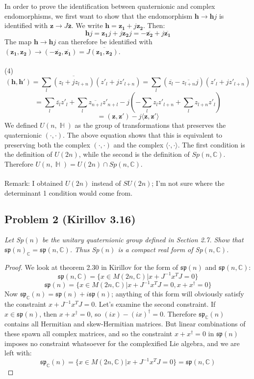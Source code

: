 \documentclass[12 pt]{article}
\newcommand{\C}{\mathbb{C}}
\DeclareMathOperator {\HH} {\mathbb{H}}
\begin{document}
\\
\\
In order to prove the identification between quaternionic and complex endomorphisms, we first want to show that the endomorphism $\mathbf{h} \to \mathbf{h}j$ is identified with $\mathbf{z} \to J \bar{\mathbf{z}}$. We write $\mathbf{h} = \mathbf{z_1} + j \mathbf{z_2}$. Then:
\[     \mathbf{h}j = \mathbf{z_1} j + j \mathbf{z_2} j = - \overline{\mathbf{z_2}} + j \overline{\mathbf{z_1}}  \]
The map $\mathbf{h} \to \mathbf{h}j$ can therefore be identified with $(\mathbf{z_1} , \mathbf{z_2}) \to ( - \overline{\mathbf{z_2}}, \overline{\mathbf{z_1}}) = J \overline{(\mathbf{z_1} , \mathbf{z_2})}$.
\\
\\
(4) \[     (\mathbf{h} , \mathbf{h'} ) = \sum_l \overline{(z_l + j z_{l+n})} (z'_l + j z'_{l+n}) = \sum_l (\overline{z_l} - \overline{z_{l+n}} j ) (z'_l + j z'_{l+n}) \]
\[     =  \sum_l \overline{z_l} z'_l + \sum_l \overline{z_{n+l}} z'_{n+l}   - j \left(- \sum_l z_l z'_{l+n} + \sum_l z_{l+n} z'_l  \right)   \]
\[    =   ( \mathbf{z} , \mathbf{z'} ) - j \langle \mathbf{z} , \mathbf{z'}  \rangle  \]
We defined $U(n, \HH)$ as the group of transformations that preserves the quaternionic $(\cdot, \cdot)$. The above equation shows that this is equivalent to preserving both the complex $(\cdot, \cdot)$ and the complex $\langle \cdot, \cdot \rangle$. The first condition is the definition of $U(2n)$, while the second is the definition of $Sp(n,\C)$. Therefore $U(n, \HH) = U(2n) \cap Sp(n,\C)$.
\\
\\
Remark: I obtained $U(2n)$ instead of $SU(2n)$; I'm not sure where the determinant 1 condition would come from.


\subsection*{Problem 2 (Kirillov 3.16)}
\emph{Let Sp$(n)$ be the unitary quaternionic group defined in Section 2.7. Show that $\mathfrak{sp}(n)_{\C} = \mathfrak{sp}(n,\C)$. Thus Sp$(n)$ is a compact real form of Sp$(n,\C)$.}

\begin{proof}
We look at theorem 2.30 in Kirillov for the form of $\mathfrak{sp} (n)$ and $\mathfrak{sp} (n,\C)$:
\[     \mathfrak{sp} (n,\C) = \{ x \in M(2n,\C) | x + J^{-1} x^T J = 0 \}       \]
\[     \mathfrak{sp} (n) = \{ x \in M(2n,\C) | x + J^{-1} x^T J = 0 , x + x^{\dagger} = 0 \}       \]
Now $ \mathfrak{sp}_{\C} (n) =  \mathfrak{sp} (n) + i  \mathfrak{sp} (n)$; anything of this form will obviously satisfy the constraint $x + J^{-1} x^T J = 0$. Let's examine the second constraint. If $x \in \mathfrak{sp} (n)$, then $ x + x^{\dagger} = 0 $, so $ (ix) - (ix)^{\dagger} = 0$. Therefore $ \mathfrak{sp}_{\C} (n)$ contains all Hermitian and skew-Hermitian matrices. But linear combinations of these spawn all complex matrices, and so the constraint $ x + x^{\dagger} = 0 $ in $ \mathfrak{sp} (n)$ imposes no constraint whatsoever for the complexified Lie algebra, and we are left with:
\[          \mathfrak{sp}_{\C} (n)  = \{ x \in M(2n,\C) | x + J^{-1} x^T J = 0 \}   =   \mathfrak{sp} (n,\C)  \]
\end{proof}
\end{document}
